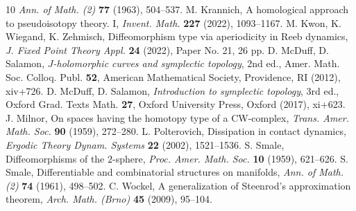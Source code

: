 \documentclass{amsart}
\theoremstyle{definition}
\begin{document}
\begin{thebibliography}{10}
  \textit{Ann. of Math. (2)} {\bf 77} (1963),
  504--537.
%
  {\sc M. Krannich},
  A homological approach to pseudoisotopy theory. I,
  \textit{Invent. Math.} {\bf 227} (2022), 1093--1167. 
%
  {\sc M. Kwon, K. Wiegand, K. Zehmisch},
  Diffeomorphism type via aperiodicity in Reeb dynamics,
  \textit{J. Fixed Point Theory Appl.} {\bf 24} (2022),
  Paper No. 21, 26 pp.
%
  {\sc D. McDuff, D. Salamon},
  \textit{$J$-holomorphic curves and symplectic topology},
  2nd ed.,
  Amer. Math. Soc. Colloq. Publ. {\bf 52},
  American Mathematical Society, Providence, RI (2012),
  xiv+726.
%
  {\sc D. McDuff, D. Salamon},
  \textit{Introduction to symplectic topology},
  3rd ed.,
  Oxford Grad. Texts Math. {\bf 27},
  Oxford University Press, Oxford (2017),
  xi+623.
%
  {\sc J. Milnor},
  On spaces having the homotopy type of a CW-complex,
  \textit{Trans. Amer. Math. Soc.} {\bf 90} (1959),
  272--280.
%
  {\sc L. Polterovich},
  Dissipation in contact dynamics,
  \textit{Ergodic Theory Dynam. Systems} {\bf 22} (2002),
  1521--1536.  
%
  {\sc S. Smale},
  Diffeomorphisms of the {$2$}-sphere,
  \textit{Proc. Amer. Math. Soc.} {\bf 10} (1959),
  621--626.
%
  {\sc S. Smale},
  Differentiable and combinatorial structures on manifolds,
  \textit{Ann. of Math. (2)} {\bf 74} (1961),
  498--502.
%
  {\sc C. Wockel},
  A generalization of Steenrod's approximation theorem,
  \textit{Arch. Math. (Brno)} {\bf 45} (2009),
  95--104.
\end{thebibliography}
\end{document}
